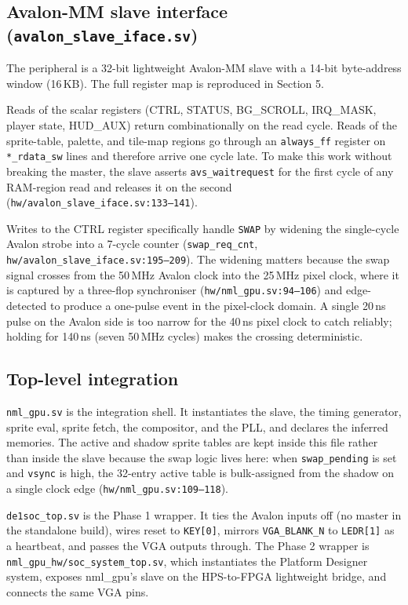 \documentclass[11pt,letterpaper]{article}
\begin{document}
\subsection{Avalon-MM slave interface (\texttt{avalon\_slave\_iface.sv})}

The peripheral is a 32-bit lightweight Avalon-MM slave with a 14-bit
byte-address window (16\,KB). The full register map is reproduced in Section 5.

Reads of the scalar registers (CTRL, STATUS, BG\_SCROLL, IRQ\_MASK, player
state, HUD\_AUX) return combinationally on the read cycle. Reads of the
sprite-table, palette, and tile-map regions go through an \texttt{always\_ff}
register on \texttt{*\_rdata\_sw} lines and therefore arrive one cycle late.
To make this work without breaking the master, the slave asserts
\texttt{avs\_waitrequest} for the first cycle of any RAM-region read and
releases it on the second (\texttt{hw/avalon\_slave\_iface.sv:133--141}).

Writes to the CTRL register specifically handle \texttt{SWAP} by widening the
single-cycle Avalon strobe into a 7-cycle counter (\texttt{swap\_req\_cnt},
\texttt{hw/avalon\_slave\_iface.sv:195--209}). The widening matters because
the swap signal crosses from the 50\,MHz Avalon clock into the 25\,MHz pixel
clock, where it is captured by a three-flop synchroniser
(\texttt{hw/nml\_gpu.sv:94--106}) and edge-detected to produce a one-pulse
event in the pixel-clock domain. A single 20\,ns pulse on the Avalon side is
too narrow for the 40\,ns pixel clock to catch reliably; holding for 140\,ns
(seven 50\,MHz cycles) makes the crossing deterministic.

\subsection{Top-level integration}

\texttt{nml\_gpu.sv} is the integration shell. It instantiates the slave, the
timing generator, sprite eval, sprite fetch, the compositor, and the PLL,
and declares the inferred memories. The active and shadow sprite tables are
kept inside this file rather than inside the slave because the swap logic
lives here: when \texttt{swap\_pending} is set and \texttt{vsync} is high,
the 32-entry active table is bulk-assigned from the shadow on a single clock
edge (\texttt{hw/nml\_gpu.sv:109--118}).

\texttt{de1soc\_top.sv} is the Phase 1 wrapper. It ties the Avalon inputs off
(no master in the standalone build), wires reset to \texttt{KEY[0]}, mirrors
\texttt{VGA\_BLANK\_N} to \texttt{LEDR[1]} as a heartbeat, and passes the VGA
outputs through. The Phase 2 wrapper is \texttt{nml\_gpu\_hw/soc\_system\_top.sv},
which instantiates the Platform Designer system, exposes nml\_gpu's slave on
the HPS-to-FPGA lightweight bridge, and connects the same VGA pins.
\end{document}
